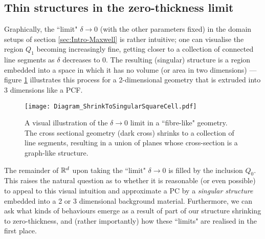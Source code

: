 \subsection{Thin structures in the zero-thickness limit} \label{ssec:Intro-ThinStructures}
Graphically, the ``limit" $\delta\rightarrow0$ (with the other parameters fixed) in the domain setups of section \ref{sec:Intro-Maxwell} is rather intuitive; one can visualise the region $Q_1$ becoming increasingly fine, getting closer to a collection of connected line segments as $\delta$ decreases to 0.
The resulting (singular) structure is a region embedded into a space in which it has no volume (or area in two dimensions) --- figure \ref{fig:Diagram_ShrinkToSingularSquareCell} illustrates this process for a 2-dimensional geometry that is extruded into 3 dimensions like a PCF.
\begin{figure}[t]
	\centering
	\texttt{[image: Diagram\_ShrinkToSingularSquareCell.pdf]}
	\caption[Visual illustration of the singular limit of a thin-structure geometry.]{\label{fig:Diagram_ShrinkToSingularSquareCell} A visual illustration of the $\delta\rightarrow0$ limit in a ``fibre-like" geometry. The cross sectional geometry (dark cross) shrinks to a collection of line segments, resulting in a union of planes whose cross-section is a graph-like structure.}
\end{figure}
The remainder of $\mathbb{R}^d$ upon taking the ``limit" $\delta\rightarrow0$ is filled by the inclusion $Q_0$.
This raises the natural question as to whether it is reasonable (or even possible) to appeal to this visual intuition and approximate a PC by a \emph{singular structure} embedded into a 2 or 3 dimensional background material.
Furthermore, we can ask what kinds of behaviours emerge as a result of part of our structure shrinking to zero-thickness, and (rather importantly) how these ``limits" are realised in the first place.

